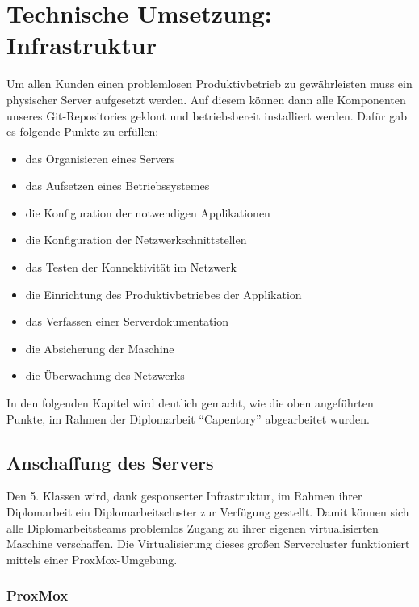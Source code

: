 \documentclass[
]{article}
\date{}
\providecommand{\tightlist}{%
  \setlength{\itemsep}{0pt}\setlength{\parskip}{0pt}}
\begin{document}
\hypertarget{technische-umsetzung-infrastruktur}{%
\section{Technische Umsetzung:
Infrastruktur}\label{technische-umsetzung-infrastruktur}}

Um allen Kunden einen problemlosen Produktivbetrieb zu gewährleisten
muss ein physischer Server aufgesetzt werden. Auf diesem können dann
alle Komponenten unseres Git-Repositories geklont und betriebsbereit
installiert werden. Dafür gab es folgende Punkte zu erfüllen:

\begin{itemize}
\tightlist
\item
  das Organisieren eines Servers
\item
  das Aufsetzen eines Betriebssystemes
\item
  die Konfiguration der notwendigen Applikationen
\item
  die Konfiguration der Netzwerkschnittstellen
\item
  das Testen der Konnektivität im Netzwerk
\item
  die Einrichtung des Produktivbetriebes der Applikation
\item
  das Verfassen einer Serverdokumentation
\item
  die Absicherung der Maschine
\item
  die Überwachung des Netzwerks
\end{itemize}

In den folgenden Kapitel wird deutlich gemacht, wie die oben angeführten
Punkte, im Rahmen der Diplomarbeit ``Capentory'' abgearbeitet wurden.

\hypertarget{anschaffung-des-servers}{%
\subsection{Anschaffung des Servers}\label{anschaffung-des-servers}}

Den 5. Klassen wird, dank gesponserter Infrastruktur, im Rahmen ihrer
Diplomarbeit ein Diplomarbeitscluster zur Verfügung gestellt. Damit
können sich alle Diplomarbeitsteams problemlos Zugang zu ihrer eigenen
virtualisierten Maschine verschaffen. Die Virtualisierung dieses großen
Servercluster funktioniert mittels einer ProxMox-Umgebung.

\hypertarget{proxmox}{%
\subsubsection{ProxMox}\label{proxmox}}
\end{document}
